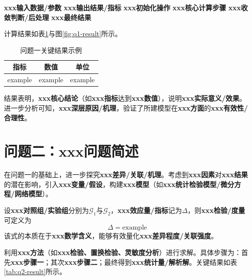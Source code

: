 \documentclass[draft,12pt,a4paper]{ctexart}
\theoremstyle{definition}
\begin{document}
\begin{algorithm}[H]
\caption{问题一求解流程示例}\label{alg:q1}
\begin{algorithmic}[1]
\Require \textbf{xxx输入数据/参数}
\Ensure \textbf{xxx输出结果/指标}
\State \textbf{xxx初始化操作}
\State \textbf{xxx核心计算步骤}
\State \textbf{xxx收敛判断/后处理}
\State \Return \textbf{xxx最终结果}
\end{algorithmic}
\end{algorithm}

计算结果如表\ref{tab:q1-result}与图\ref{fig:q1-result}所示。

\begin{table}[H]\centering
  \caption{问题一关键结果示例}\label{tab:q1-result}
  \small
  \begin{tabular}{ccc}
    \toprule
    \textbf{指标} & \textbf{数值} & \textbf{单位} \\
    \midrule
    example & example & example \\
    \bottomrule
  \end{tabular}
\end{table}



结果表明，\textbf{xxx核心结论}（如\textbf{xxx指标}达到\textbf{xxx数值}），说明\textbf{xxx实际意义/效果}。进一步分析可知，\textbf{xxx深层原因/机理}，验证了所建模型在\textbf{xxx方面}的\textbf{xxx有效性/合理性}。


\section{问题二：\textbf{xxx问题简述}}

在问题一的基础上，进一步探究\textbf{xxx差异/关联/机理}。考虑到\textbf{xxx因素}对\textbf{xxx结果}的潜在影响，引入\textbf{xxx变量/假设}，构建\textbf{xxx模型}（如\textbf{xxx统计检验模型/微分方程/网络模型}）。

设\textbf{xxx对照组/实验组}分别为$\mathcal{G}_1$与$\mathcal{G}_2$，\textbf{xxx效应量/指标}记为$\Delta$，则\textbf{xxx检验/度量}可定义为
\begin{equation}\label{eq:q2-model}
  \Delta = \text{example}
\end{equation}
该式的本质在于\textbf{xxx数学含义}，能够有效量化\textbf{xxx差异程度/关联强度}。

利用\textbf{xxx方法}（如\textbf{xxx检验、置换检验、灵敏度分析}）进行求解。具体步骤为：首先\textbf{xxx步骤一}；其次\textbf{xxx步骤二}；最终得到\textbf{xxx统计量/解析解}。关键结果如表\ref{tab:q2-result}所示。
\end{document}
